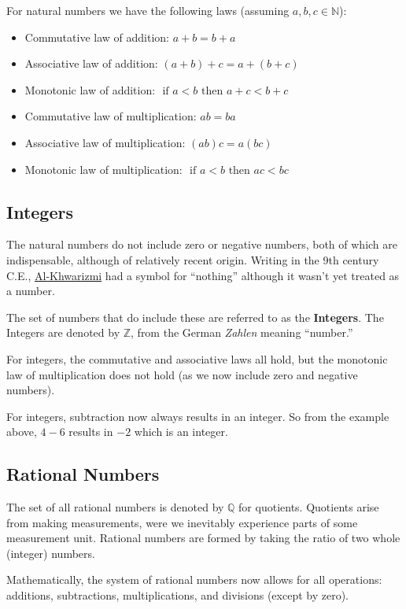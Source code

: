 For natural numbers we have the following laws (assuming $a,b,c \in \mathbb{N}$):

\begin{itemize}
    \item Commutative law of addition: $a+b=b+a$
    \item Associative law of addition: $(a+b)+c = a + (b+c)$
    \item Monotonic law of addition: $ \text{ if } a < b \text{ then } a+c<b+c$
    \item Commutative law of multiplication: $ab=ba$
    \item Associative law of multiplication: $(ab)c=a(bc)$
    \item Monotonic law of multiplication: $ \text{ if } a < b \text{ then } ac<bc$
\end{itemize}

\subsection{Integers}
The natural numbers do not include zero or negative numbers, both of which are indispensable, although of relatively recent origin. Writing in the 9th century C.E., \href{https://en.wikipedia.org/wiki/Mu%E1%B8%A5ammad_ibn_M%C5%ABs%C4%81_al-Khw%C4%81rizm%C4%AB}{Al-Khwarizmi} had a symbol for ``nothing'' although it wasn't yet treated as a number.

The set of numbers that do include these are referred to as the \textbf{Integers}. The Integers are denoted by $\mathbb{Z}$, from the German \emph{Zahlen} meaning ``number.''

For integers, the commutative and associative laws all hold, but the monotonic law of multiplication does not hold (as we now include zero and negative numbers).

For integers, subtraction now always results in an integer. So from the example above, $4-6$ results in $-2$ which is an integer.


\subsection{Rational Numbers}

The set of all rational numbers is denoted by $\mathbb{Q}$ for quotients. Quotients arise from making measurements, were we inevitably experience parts of some measurement unit. Rational numbers are formed  by taking the ratio of two whole (integer) numbers.

Mathematically, the system of rational numbers now allows for all operations: additions, subtractions, multiplications, and divisions (except by zero).

